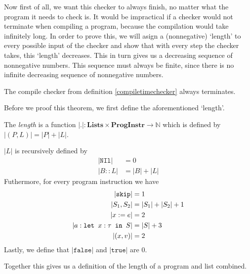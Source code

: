 Now first of all, we want this checker to always finish, no matter what the program it needs to check is. It would be impractical if a checker would not terminate when compiling a program, because the compilation would take infinitely long. In order to prove this, we will asign a (nonnegative) `length' to every possible input of the checker and show that with every step the checker takes, this `length' decreases. This in turn gives us a decreasing sequence of nonnegative numbers. This sequence must always be finite, since there is no infinite decreasing sequence of nonnegative numbers. 

\begin{theorem}
\label{termination}
The compile checker from definition \ref{compiletimechecker} always terminates.
\end{theorem}

Before we proof this theorem, we first define the aforementioned `length'. 

\begin{definition}
\label{length}
The \emph{length} is a function $|.|: \textbf{Lists} \times \textbf{ProgInstr} \to \mathbb{N}$ which is defined by $|(P,L)| = |P|+|L|$.

$|L|$ is recursively defined by 
\begin{align*}
|\texttt{NIl}| & = 0\\
|B::L| & = |B| + |L|
\end{align*}
Futhermore, for every program instruction we have
\begin{align*}
|\texttt{skip}| & = 1\\
|S_1, S_2| & = |S_1| + |S_2| + 1 \\
|x:=e| & = 2\\
|a : \texttt{let }x : \tau \texttt{ in } S| & = |S| + 3 \\
|(x,v)| & = 2 \\
\end{align*}
Lastly, we define that $|\texttt{false}|$ and $|\texttt{true}|$ are 0.

Together this gives us a definition of the length of a program and list combined.
\end{definition}

